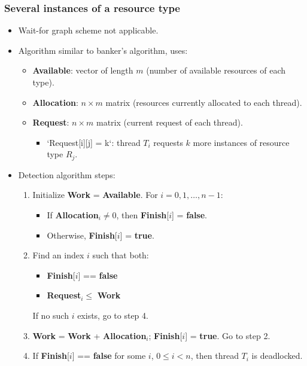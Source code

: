 \subsubsection{Several instances of a resource type}
\begin{itemize}
    \item Wait-for graph scheme not applicable.
    \item Algorithm similar to banker's algorithm, uses:
    \begin{itemize}
        \item \textbf{Available}: vector of length $m$ (number of available resources of each type).
        \item \textbf{Allocation}: $n \times m$ matrix (resources currently allocated to each thread).
        \item \textbf{Request}: $n \times m$ matrix (current request of each thread).
        \begin{itemize}
            \item `Request[i][j] = k`: thread $T_i$ requests $k$ more instances of resource type $R_j$.
        \end{itemize}
    \end{itemize}
    \item Detection algorithm steps:
    \begin{enumerate}
        \item Initialize \textbf{Work} = \textbf{Available}. For $i = 0, 1, \dots, n-1$:
        \begin{itemize}
            \item If \textbf{Allocation}$_i \neq 0$, then \textbf{Finish}[$i$] = \textbf{false}.
            \item Otherwise, \textbf{Finish}[$i$] = \textbf{true}.
        \end{itemize}
        \item Find an index $i$ such that both:
        \begin{itemize}
            \item \textbf{Finish}[$i$] == \textbf{false}
            \item \textbf{Request}$_i \leq$ \textbf{Work}
        \end{itemize}
        If no such $i$ exists, go to step 4.
        \item \textbf{Work} = \textbf{Work} + \textbf{Allocation}$_i$; \textbf{Finish}[$i$] = \textbf{true}. Go to step 2.
        \item If \textbf{Finish}[$i$] == \textbf{false} for some $i$, $0 \leq i < n$, then thread $T_i$ is deadlocked.

\end{enumerate}
\end{itemize}
